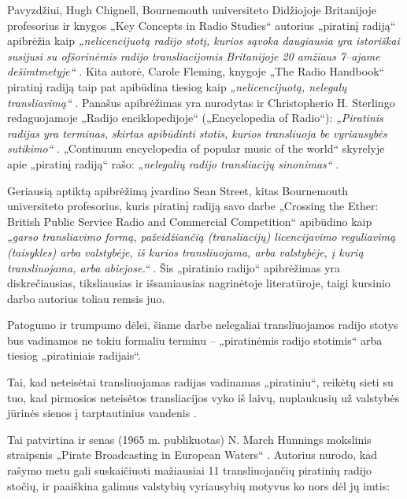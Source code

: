 \documentclass[kursinis-darbas]{vukf}
\begin{document}
Pavyzdžiui, Hugh Chignell, Bournemouth universiteto Didžiojoje Britanijoje profesorius ir knygos „Key Concepts in Radio Studies“ autorius „piratinį radiją“ apibrėžia kaip \emph{„nelicencijuotą radijo stotį, kurios sąvoka daugiausia yra istoriškai susijusi su ofšorinėmis radijo transliacijomis Britanijoje 20 amžiaus 7--ajame dešimtmetyje“} \cite[p.~137]{hc_key_concepts_in_radio_studies}. Kita autorė, Carole Fleming, knygoje „The Radio Handbook“ piratinį radiją taip pat apibūdina tiesiog kaip \emph{„nelicencijuotą, nelegalų transliavimą“} \cite[p.~35]{cf_the_radio_handbook}. Panašus apibrėžimas yra nurodytas ir Christopherio H. Sterlingo redaguojamoje „Radijo enciklopedijoje“ („Encyclopedia of Radio“): \emph{„Piratinis radijas yra terminas, skirtas apibūdinti stotis, kurios transliuoja be vyriausybės sutikimo“} \cite[p.~237]{chs_encyclopedia_of_radio}. „Continuum encyclopedia of popular music of the world“ skyrelyje apie „piratinį radiją“ rašo: \emph{„nelegalių radijo transliacijų sinonimas“} \cite[p.~447]{js_continuum_encyclopedia}.

Geriausią aptiktą apibrėžimą įvardino Sean Street, kitas Bournemouth universiteto profesorius, kuris piratinį radiją savo darbe „Crossing the Ether: British Public Service Radio and Commercial Competition“ apibūdino kaip \emph{„garso transliavimo formą, pažeidžiančią (transliacijų) licencijavimo reguliavimą (taisykles) arba valstybėje, iš kurios transliuojama, arba valstybėje, į kurią transliuojama, arba abiejose.“} \cite[p.206]{ss_crossing_the_ether_british_public_service_radio_and_commercial_competition}. Šis „piratinio radijo“ apibrėžimas yra diskrečiausias, tiksliausias ir išsamiausias nagrinėtoje literatūroje, taigi kursinio darbo autorius toliau remsis juo.

Patogumo ir trumpumo dėlei, šiame darbe nelegaliai transliuojamos radijo stotys bus vadinamos ne tokiu formaliu terminu – „piratinėmis radijo stotimis“ arba tiesiog „piratiniais radijais“.

Tai, kad neteisėtai transliuojamas radijas vadinamas „piratiniu“, reikėtų sieti su tuo, kad pirmosios neteisėtos transliacijos vyko iš laivų, nuplaukusių už valstybės jūrinės sienos į tarptautinius vandenis \cite[p.~447]{js_continuum_encyclopedia}.

Tai patvirtina ir senas (1965 m. publikuotas) N. March Hunnings mokslinis straipsnis „Pirate Broadcasting in European Waters“ \cite[p.~412]{nmh_pirate_broadcasting_in_european_waters_1965}. Autorius nurodo, kad rašymo metu gali suskaičiuoti mažiausiai 11 transliuojančių piratinių radijo stočių, ir paaiškina galimus valstybių vyriausybių motyvus ko nors dėl jų imtis:
\end{document}
